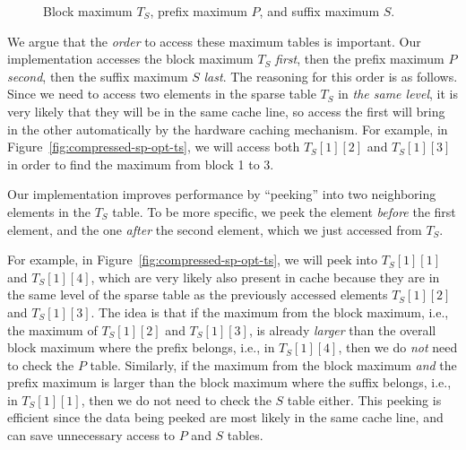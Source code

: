 

\begin{figure}[!thb]
  \centering {}  \caption{Block maximum $T_S$, prefix maximum $P$, and suffix maximum $S$.}
  \label{fig:compressed-sp-opt}
\end{figure}

We argue that the {\em order} to access these maximum tables is
important.  Our implementation accesses the block maximum $T_S$ {\em
  first}, then the prefix maximum $P$ {\em second}, then the suffix
maximum $S$ {\em last}.  The reasoning for this order is as follows.
Since we need to access two elements in the sparse table $T_S$ in {\em
  the same level}, it is very likely that they will be in the same
cache line, so access the first will bring in the other automatically
by the hardware caching mechanism.  For example, in
Figure~\ref{fig:compressed-sp-opt-ts}, we will access both
$T_{S}[1][2]$ and $T_{S}[1][3]$ in order to find the maximum from
block 1 to 3.

Our implementation improves performance by ``peeking'' into two
neighboring elements in the $T_{S}$ table.  To be more specific, we
peek the element {\em before} the first element, and the one {\em
  after} the second element, which we just accessed from $T_S$.

For example, in Figure~\ref{fig:compressed-sp-opt-ts}, we will peek
into $T_{S}[1][1]$ and $T_{S}[1][4]$, which are very likely also
present in cache because they are in the same level of the sparse
table as the previously accessed elements $T_{S}[1][2]$ and
$T_{S}[1][3]$.  The idea is that if the maximum from the block
maximum, i.e., the maximum of $T_{S}[1][2]$ and $T_{S}[1][3]$, is
already {\em larger} than the overall block maximum where the prefix
belongs, i.e., in $T_{S}[1][4]$, then we do {\em not} need to check
the $P$ table.  Similarly, if the maximum from the block maximum {\em
  and} the prefix maximum is larger than the block maximum where the
suffix belongs, i.e., in $T_{S}[1][1]$, then we do not need to check
the $S$ table either.  This peeking is efficient since the data being
peeked are most likely in the same cache line, and can save
unnecessary access to $P$ and $S$ tables.

